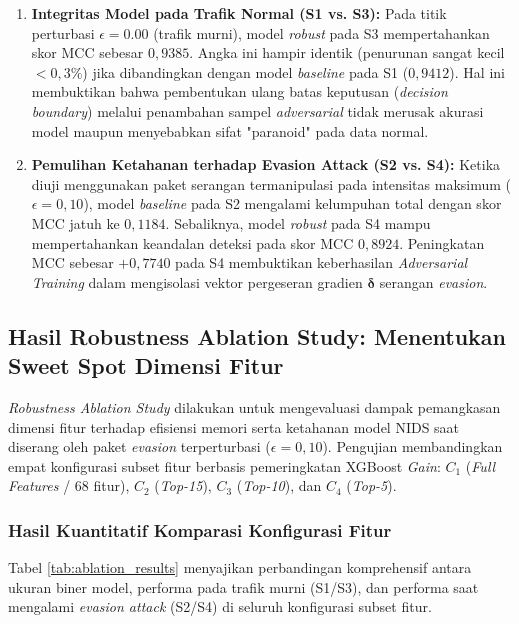 \documentclass[11pt, a4paper]{article}
\begin{document}
\begin{enumerate}
    \item \textbf{Integritas Model pada Trafik Normal (S1 vs. S3):} 
    Pada titik perturbasi $\epsilon = 0.00$ (trafik murni), model \textit{robust} pada S3 mempertahankan skor MCC sebesar $0{,}9385$. Angka ini hampir identik (penurunan sangat kecil $< 0{,}3\%$) jika dibandingkan dengan model \textit{baseline} pada S1 ($0{,}9412$). Hal ini membuktikan bahwa pembentukan ulang batas keputusan (\textit{decision boundary}) melalui penambahan sampel \textit{adversarial} tidak merusak akurasi model maupun menyebabkan sifat "paranoid" pada data normal.

    \item \textbf{Pemulihan Ketahanan terhadap Evasion Attack (S2 vs. S4):} 
    Ketika diuji menggunakan paket serangan termanipulasi pada intensitas maksimum ($\epsilon = 0{,}10$), model \textit{baseline} pada S2 mengalami kelumpuhan total dengan skor MCC jatuh ke $0{,}1184$. Sebaliknya, model \textit{robust} pada S4 mampu mempertahankan keandalan deteksi pada skor MCC $0{,}8924$. Peningkatan MCC sebesar $+0{,}7740$ pada S4 membuktikan keberhasilan \textit{Adversarial Training} dalam mengisolasi vektor pergeseran gradien $\boldsymbol{\delta}$ serangan \textit{evasion}.
\end{enumerate}


\subsection{Hasil Robustness Ablation Study: Menentukan Sweet Spot Dimensi Fitur}
\textit{Robustness Ablation Study} dilakukan untuk mengevaluasi dampak pemangkasan dimensi fitur terhadap efisiensi memori serta ketahanan model NIDS saat diserang oleh paket \textit{evasion} terperturbasi ($\epsilon = 0{,}10$). Pengujian membandingkan empat konfigurasi subset fitur berbasis pemeringkatan XGBoost \textit{Gain}: $C_1$ (\textit{Full Features} / 68 fitur), $C_2$ (\textit{Top-15}), $C_3$ (\textit{Top-10}), dan $C_4$ (\textit{Top-5}).

\subsubsection{Hasil Kuantitatif Komparasi Konfigurasi Fitur}
Tabel \ref{tab:ablation_results} menyajikan perbandingan komprehensif antara ukuran biner model, performa pada trafik murni (S1/S3), dan performa saat mengalami \textit{evasion attack} (S2/S4) di seluruh konfigurasi subset fitur.
\end{document}
